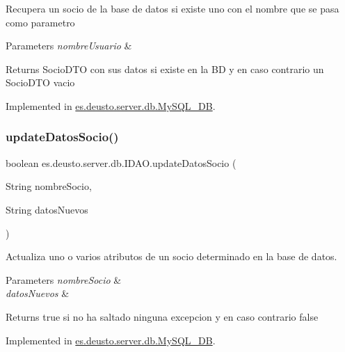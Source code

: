 Recupera un socio de la base de datos si existe uno con el nombre que se pasa como parametro 
\begin{DoxyParams}{Parameters}
{\em nombre\+Usuario} & \\
\hline
\end{DoxyParams}
\begin{DoxyReturn}{Returns}
Socio\+D\+TO con sus datos si existe en la BD y en caso contrario un Socio\+D\+TO vacio 
\end{DoxyReturn}


Implemented in \mbox{\hyperlink{classes_1_1deusto_1_1server_1_1db_1_1_my_s_q_l___d_b_a36eec47b7d590c9dd37aec41af2033db}{es.\+deusto.\+server.\+db.\+My\+S\+Q\+L\+\_\+\+DB}}.

\mbox{\label{interfacees_1_1deusto_1_1server_1_1db_1_1_i_d_a_o_a1e999400f9494d0860c70338fa87271b}} 
\subsubsection{\texorpdfstring{updateDatosSocio()}{updateDatosSocio()}}
{\footnotesize\ttfamily boolean es.\+deusto.\+server.\+db.\+I\+D\+A\+O.\+update\+Datos\+Socio (\begin{DoxyParamCaption}\item[{String}]{nombre\+Socio,  }\item[{String}]{datos\+Nuevos }\end{DoxyParamCaption})}

Actualiza uno o varios atributos de un socio determinado en la base de datos. 
\begin{DoxyParams}{Parameters}
{\em nombre\+Socio} & \\
\hline
{\em datos\+Nuevos} & \\
\hline
\end{DoxyParams}
\begin{DoxyReturn}{Returns}
true si no ha saltado ninguna excepcion y en caso contrario false 
\end{DoxyReturn}


Implemented in \mbox{\hyperlink{classes_1_1deusto_1_1server_1_1db_1_1_my_s_q_l___d_b_aa2865a9bd2ac6181664979c3a61615e1}{es.\+deusto.\+server.\+db.\+My\+S\+Q\+L\+\_\+\+DB}}.

\mbox{\label{interfacees_1_1deusto_1_1server_1_1db_1_1_i_d_a_o_acacb303b116d7f8f53b5b60f3e647203}} 
